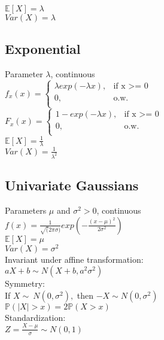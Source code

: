 $\mathbb{E}[X]=\lambda$\\
$Var(X)=\lambda$\\

\subsection*{Exponential}
Parameter $\lambda$, continuous\\
$ f_x(x)=
	\begin{cases}
		 \lambda exp(-\lambda x),&\text{if x >= 0}\\
		0,&\text{o.w.}\\
	\end{cases}
$\\
$ F_x(x)=
	\begin{cases}
		 1-exp(-\lambda x),&\text{if x >= 0}\\
		0,&\text{o.w.}\\
	\end{cases}
$\\

$\mathbb{E}[X]=\frac{1}{\lambda}$\\
$Var(X)=\frac{1}{\lambda^2}$\\

\subsection*{Univariate Gaussians}
Parameters $\mu$ and $\sigma^2 >0$, continuous\\
$f(x)= \frac{1}{\sqrt(2 \pi \sigma)} exp(-\frac{(x-\mu)^2}{2\sigma^2})$ \\
$\mathbb{E}[X]=\mu$ \\
$Var(X)=\sigma^2$\\

Invariant under affine transformation:\\

$aX+b \sim N(X+b,a^2\sigma^2)$\\

Symmetry:\\

If $X \sim\ N(0,\sigma^2),$ then $-X \sim N(0,\sigma^2)$\\

$\mathbb{P}(|X|>x) = 2\mathbb{P}(X>x)$\\

Standardization:\\

$Z= \frac{X-\mu}{\sigma} \sim N(0,1)$\\

